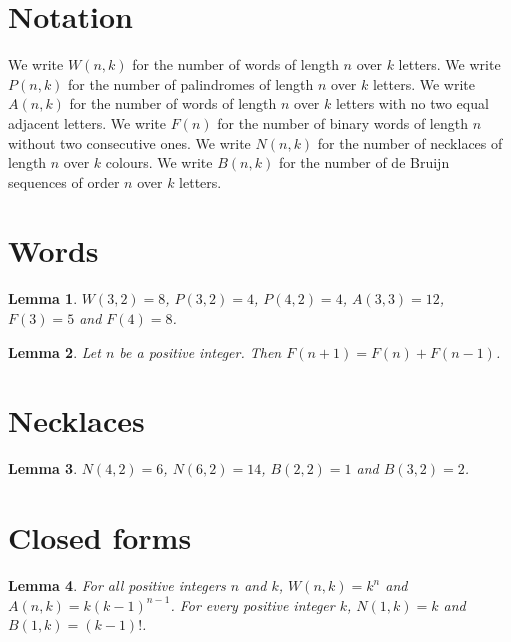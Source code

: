 \documentclass{article}
\newtheorem{lemma}{Lemma}
\begin{document}
\section{Notation}

We write $W(n,k)$ for the number of words of length $n$ over $k$ letters.
We write $P(n,k)$ for the number of palindromes of length $n$ over $k$ letters.
We write $A(n,k)$ for the number of words of length $n$ over $k$ letters with no two equal adjacent letters.
We write $F(n)$ for the number of binary words of length $n$ without two consecutive ones.
We write $N(n,k)$ for the number of necklaces of length $n$ over $k$ colours.
We write $B(n,k)$ for the number of de Bruijn sequences of order $n$ over $k$ letters.

\section{Words}

\begin{lemma}\label{words}
$W(3,2)=8$, $P(3,2)=4$, $P(4,2)=4$, $A(3,3)=12$, $F(3)=5$ and $F(4)=8$.
\end{lemma}

\begin{lemma}\label{fibonacci}
Let $n$ be a positive integer. Then $F(n+1)=F(n)+F(n-1)$.
\end{lemma}

\section{Necklaces}

\begin{lemma}\label{necklaces}
$N(4,2)=6$, $N(6,2)=14$, $B(2,2)=1$ and $B(3,2)=2$.
\end{lemma}

\section{Closed forms}

\begin{lemma}\label{closed}
For all positive integers $n$ and $k$, $W(n,k)=k^n$ and $A(n,k)=k(k-1)^{n-1}$. For every positive integer $k$, $N(1,k)=k$ and $B(1,k)=(k-1)!$.
\end{lemma}
\end{document}
